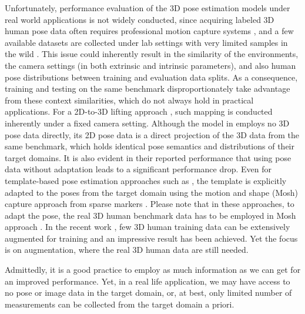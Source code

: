 \documentclass[twocolumn]{svjour3}          \smartqed  \usepackage{graphicx}
\begin{document}
Unfortunately, performance evaluation of the 3D pose estimation models  under  real world applications is not widely conducted, since  acquiring labeled 3D human pose data often requires professional motion capture systems \cite{h36m_pami}, and a few available datasets are collected under lab settings with very limited samples in the wild \cite{singleshotmultiperson2018}. This issue could inherently result in the similarity of the  environments, the camera settings (in both extrinsic and intrinsic parameters), and also human pose distributions between training and evaluation data splits. As a consequence, training and testing on the same benchmark disproportionately take advantage from these context similarities, which do not always hold in practical applications.  For a 2D-to-3D lifting approach \cite{martinez2017simple}, such mapping is  conducted inherently under a fixed camera setting. 
Although the model in \cite{chen2019unsupervised} employs no 3D pose data directly,  its 2D pose data is a direct projection of the 3D data from the same benchmark, which holds identical pose semantics and distributions of their target domains. 
It is also evident in their reported performance that using pose data without adaptation leads to a significant performance drop.  
Even for template-based pose estimation approaches such as \cite{bogo2016keep},  the template is  explicitly adapted to the poses from the target domain using the motion and shape (Mosh) capture  approach from sparse markers \cite{loper2014mosh}. Please note that in these approaches, to adapt the pose, the real 3D human benchmark data has to be employed in Mosh approach \cite{loper2014mosh}. 
In the recent work \cite{Li_2020_CVPR}, few 3D human training data can be extensively augmented for training and an impressive result has been achieved. Yet the focus is on augmentation, where the real 3D human data are still needed. 

Admittedly, 
it is a good practice to employ as much information as we can get for an improved performance. Yet, in a real life application, we may have access to no pose or image data in the target domain, or, at best, only limited number of measurements can be collected from the target domain a priori. 
\end{document}

